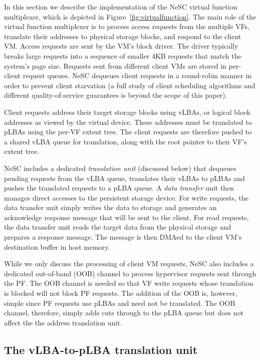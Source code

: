 In this section we describe the implementation of the NeSC virtual function multiplexer, which is depicted in Figure~\ref{fig:virtualfunction}. The main role of the  virtual function multiplexer is to process access requests from the multiple VFs, translate their addresses to physical storage blocks, and respond to the client VM.
%
Access requests are sent by the VM's block driver. The driver typically breaks large requests into a sequence of smaller 4KB requests that match the system's page size. Requests sent from different client VMs are stored in per-client request queues. NeSC dequeues client requests in a round-robin manner in order to prevent client starvation (a full study of client scheduling algorithms and different quality-of-service guarantees is beyond the scope of this paper).

Client requests address their target storage blocks using vLBAs, or logical block addresses as viewed by the virtual device. These addresses must be translated to pLBAs using the per-VF extent tree. The client requests are therefore pushed to a shared vLBA queue for translation, along with the root pointer to their VF's extent tree.

NeSC includes a dedicated \emph{translation unit} (discussed below) that dequeues pending requests from the vLBA queue, translates their vLBAs to pLBAs and pushes the translated requests to a pLBA queue. A \emph{data transfer} unit then manages direct accesses to the persistent storage device. For write requests, the data transfer unit simply writes the data to storage and generates an acknowledge response message that will be sent to the client. For read requests, the data transfer unit reads the target data from the physical storage and prepares a response message. The message is then DMAed to the client VM's destination buffer in host memory.

While we only discuss the processing of client VM requests, NeSC also includes a dedicated out-of-band (OOB) channel to process hypervisor requests sent through the PF. The OOB channel is needed so that VF write requests whose translation is blocked will not block PF requests. The addition of the OOB is, however, simple since PF requests use pLBAs and need not be translated. The OOB channel, therefore, simply adds cuts through to the pLBA queue but does not affect the the address translation unit.

\subsection*{The vLBA-to-pLBA translation unit}

